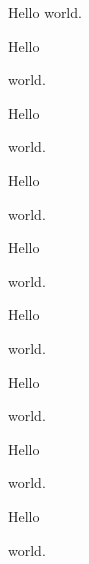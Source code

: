 \documentclass{article}
\begin{document}
Hello world.\\[6pt]

\begin{large}Hello\end{large} world.\\[6pt]

\begin{Large}Hello\end{Large} world.\\[6pt]

\begin{huge}Hello\end{huge} world.\\[6pt]

\begin{Huge}Hello\end{Huge} world.\\[6pt]

\begin{normalsize}Hello\end{normalsize} world.\\[6pt]

\begin{small}Hello\end{small} world.\\[6pt]

\begin{scriptsize}Hello\end{scriptsize} world.\\[6pt]

\begin{tiny}Hello\end{tiny} world.\\[6pt]
\end{document}
